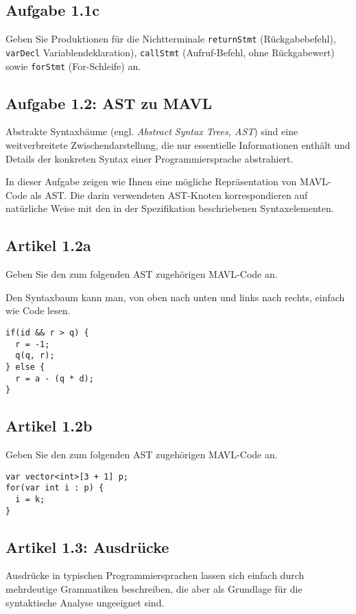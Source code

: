 \documentclass[
  ngerman,
  DIV=14
]{scrartcl}
\begin{document}
\subsection*{Aufgabe 1.1c}

Geben Sie Produktionen für die Nichtterminale \texttt{returnStmt} (Rückgabebefehl), \texttt{varDecl} Variablendeklaration), \texttt{callStmt} (Aufruf-Befehl, ohne Rückgabewert) sowie \texttt{forStmt} (For-Schleife) an.




\subsection*{Aufgabe 1.2: AST zu MAVL}
Abstrakte Syntaxbäume (engl. \emph{Abstract Syntax Trees, AST}) sind eine weitverbreitete Zwischendarstellung, die nur essentielle Informationen enthält und Details der konkreten Syntax einer Programmiersprache abstrahiert.

\medskip\noindent
In dieser Aufgabe zeigen wie Ihnen eine mögliche Repräsentation von MAVL-Code als AST. Die darin verwendeten AST-Knoten korrespondieren auf natürliche Weise mit den in der Spezifikation beschriebenen Syntaxelementen. 

\subsection*{Artikel 1.2a}
Geben Sie den zum folgenden AST zugehörigen MAVL-Code an.  

\bigskip\noindent
Den Syntaxbaum kann man, von oben nach unten und links nach rechts, einfach wie Code lesen.
\begin{lstlisting}
if(id && r > q) {
  r = -1;
  q(q, r);
} else {
  r = a - (q * d);
}
\end{lstlisting}


\subsection*{Artikel 1.2b}
Geben Sie den zum folgenden AST zugehörigen MAVL-Code an.  

\bigskip\noindent
\begin{lstlisting}
var vector<int>[3 + 1] p;
for(var int i : p) {
  i = k;
}  
\end{lstlisting}


\subsection*{Artikel 1.3: Ausdrücke}
Ausdrücke in typischen Programmiersprachen lassen sich einfach durch mehrdeutige Grammatiken beschreiben, die aber als Grundlage für die syntaktische Analyse ungeeignet sind.
\end{document}
